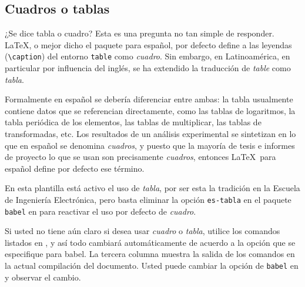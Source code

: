 \subsection{Cuadros o tablas}

¿Se dice tabla o cuadro? Esta es una pregunta no tan simple de
responder.  \LaTeX, o mejor dicho el paquete  para
español, por defecto define a las leyendas (\verb+\caption+) del
entorno \verb+table+ como \emph{cuadro}.  Sin embargo, en
Latinoamérica, en particular por influencia del inglés, se ha
extendido la traducción de \emph{table} como \emph{tabla}.

Formalmente en español se debería diferenciar entre ambas: la tabla
usualmente contiene datos que se referencian directamente, como las
tablas de logaritmos, la tabla periódica de los elementos, las tablas
de multiplicar, las tablas de transformadas, etc.  Los resultados de
un análisis experimental se sintetizan en lo que en español se
denomina \emph{cuadros}, y puesto que la mayoría de tesis e informes
de proyecto lo que se usan son precisamente \emph{cuadros}, entonces
\LaTeX\ para español define por defecto ese término.

En esta plantilla está activo el uso de \emph{tabla}, por ser esta la
tradición en la Escuela de Ingeniería Electrónica, pero basta eliminar
la opción \verb+es-tabla+ en el paquete \verb+babel+ en
 para reactivar el uso por defecto de \emph{cuadro}.

Si usted no tiene aún claro si desea usar \emph{cuadro} o
\emph{tabla}, utilice los comandos listados en
, y así todo cambiará automáticamente de
acuerdo a la opción que se especifique para babel.  La tercera columna
muestra la salida de los comandos en la actual compilación del
documento.  Usted puede cambiar la opción de \verb+babel+ en
 y observar el cambio.

